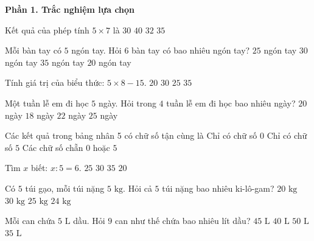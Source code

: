 \textbf{Phần 1. Trắc nghiệm lựa chọn}

\begin{ex} %
Kết quả của phép tính $5 \times 7$ là
\choice
{$30$}
{$40$}
{$32$}
{\True $35$}
\end{ex}

\begin{ex} %
Mỗi bàn tay có $5$ ngón tay. Hỏi $6$ bàn tay có bao nhiêu ngón tay?
\choice
{$25$ ngón tay}
{\True $30$ ngón tay}
{$35$ ngón tay}
{$20$ ngón tay}
\end{ex}

\begin{ex} %
Tính giá trị của biểu thức: $5 \times 8 - 15$.
\choice
{$20$}
{$30$}
{\True $25$}
{$35$}
\end{ex}

\begin{ex} %
Một tuần lễ em đi học $5$ ngày. Hỏi trong $4$ tuần lễ em đi học bao nhiêu ngày?
\choice
{\True $20$ ngày}
{$18$ ngày}
{$22$ ngày}
{$25$ ngày}
\end{ex}

\begin{ex} %
Các kết quả trong bảng nhân 5 có chữ số tận cùng là
\choice
{Chỉ có chữ số $0$}
{Chỉ có chữ số $5$}
{Các chữ số chẵn}
{\True $0\text{ hoặc } 5$}
\end{ex}

\begin{ex} %
Tìm $x$ biết: $x : 5 = 6$.
\choice
{$25$}
{\True $30$}
{$35$}
{$20$}
\end{ex}

\begin{ex} %
Có $5$ túi gạo, mỗi túi nặng $5\text{ kg}$. Hỏi cả $5$ túi nặng bao nhiêu ki-lô-gam?
\choice
{$20\text{ kg}$}
{$30\text{ kg}$}
{\True $25\text{ kg}$}
{$24\text{ kg}$}
\end{ex}

\begin{ex} %
Mỗi can chứa $5\text{ L}$ dầu. Hỏi $9$ can như thế chứa bao nhiêu lít dầu?
\choice
{\True $45\text{ L}$}
{$40\text{ L}$}
{$50\text{ L}$}
{$35\text{ L}$}
\end{ex}

